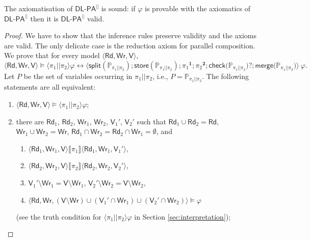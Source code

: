 \documentclass{llncs}
\newcommand{\progStore}{\mathsf{store}}
\newcommand{\progOkChange}{\mathsf{check}}
\newcommand{\progsplit}{\mathsf{split}}
\newcommand{\progmerge}{\mathsf{merge}}
\newcommand{\cp}[2]{{#2}^\mathbf{#1}}
\newcommand{\pll}{ {||} }							%
\newcommand{\readset}{\mathsf{Rd}}
\newcommand{\valuset}{\mathsf{V}}
\newcommand{\writeset}{\mathsf{Wr}}
\newcommand{\testpdl}{?}				%
\newcommand{\DlpaPll}{\ensuremath{\mathsf{DL\text{-}PA}^\pll}\xspace}
\newcommand{\intPgm}[1]{\llbracket #1 \rrbracket}
\newcommand{\ldia}[1]{ \big\langle #1 \big\rangle}
\newcommand{\leqv}{ \leftrightarrow }
\renewcommand{\phi}{\varphi}
\newcommand{\propset}{\mathbb P}
\newcommand{\propsetOf}[1]{\propset_{#1}}
\newcommand{\tuple}[1]{ \langle #1 \rangle}
\begin{document}
\begin{theorem}
The axiomatisation of \DlpaPll is sound:
if $\phi$ is provable with the axiomatics of \DlpaPll then it is \DlpaPll valid.
\end{theorem}
\begin{proof}
We have to show that the inference rules preserve validity and the axioms are valid. 
The only delicate case is the reduction axiom for parallel composition.
We prove that for every model $\tuple{\readset,\writeset,\valuset}$,
$$ \tuple{\readset,\writeset,\valuset} \models \ldia{\pi_1 \pll \pi_2}  \phi \leqv  
\ldia{ 
\progsplit( \propsetOf{\pi_1 \pll \pi_2} ) ; 
\progStore( \propsetOf{\pi_1 \pll \pi_2} ) ;
\cp 1 {\pi_1} ; \cp 2 {\pi_2} ; 
\progOkChange \big(\propsetOf{\pi_1 \pll \pi_2} \big) \testpdl ;
\progmerge \big(\propsetOf{\pi_1 \pll \pi_2} \big)
} ~ \phi . $$
Let $P$ be the set of variables occurring in $\pi_1 \pll \pi_2$, i.e., $P = \propsetOf{\pi_1 \pll \pi_2}$.
The following statements are all equivalent: %
\begin{enumerate}
\item
$ \tuple{\readset,\writeset,\valuset} \models \ldia{\pi_1 \pll \pi_2}  \phi $;

\item
there are 
$\readset_1$, $\readset_2$, $\writeset_1$, $\writeset_2$, $\valuset_1'$, $\valuset_2'$ such that 
$\readset_1 \cup \readset_2 = \readset$, $\writeset_1 \cup \writeset_2 = \writeset$, 
$\readset_1 \cap \writeset_2 = \readset_2 \cap \writeset_1 = \emptyset$, and
 \begin{enumerate}
 \item
$\tuple{\readset_1,\writeset_1,\valuset} \intPgm{\pi_1} \tuple{\readset_1,\writeset_1,\valuset_1'}$,
 \item
$\tuple{\readset_2,\writeset_2,\valuset} \intPgm{\pi_2} \tuple{\readset_2,\writeset_2,\valuset_2'}$,
 \item
$\valuset_1' \setminus \writeset_1 = \valuset \setminus \writeset_1 $,
$\valuset_2' \setminus \writeset_2 = \valuset \setminus \writeset_2 $,
 \item
$\tuple{\readset,\writeset, 
(\valuset {\setminus} \writeset) \cup (\valuset_1' {\cap} \writeset_1) \cup (\valuset_2' {\cap} \writeset_2) } \models \phi$ 
\end{enumerate}
(see the truth condition for $\ldia{\pi_1 \pll \pi_2}  \phi $ in Section \ref{sec:interpretation});


\end{enumerate}
\end{proof}
\end{document}

